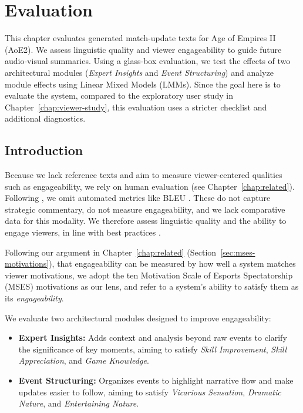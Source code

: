 \chapter{Evaluation}\label{chap:eval}
This chapter evaluates generated match-update texts for Age of Empires II (AoE2). We assess linguistic quality and viewer engageability to guide future audio-visual summaries. Using a glass-box evaluation, we test the effects of two architectural modules (\textit{Expert Insights} and \textit{Event Structuring}) and analyze module effects using Linear Mixed Models (LMMs). Since the goal here is to evaluate the system, compared to the exploratory user study in Chapter~\ref{chap:viewer-study}, this evaluation uses a stricter checklist and additional diagnostics.

\section{Introduction}
Because we lack reference texts and aim to measure viewer-centered qualities such as engageability, we rely on human evaluation (see Chapter~\ref{chap:related}). Following \citet{wang2025}, we omit automated metrics like BLEU \cite{papineni2002}. These do not capture strategic commentary, do not measure engageability, and we lack comparative data for this modality. We therefore assess linguistic quality and the ability to engage viewers, in line with best practices \cite{vanderlee2021}.

Following our argument in Chapter~\ref{chap:related} (Section~\ref{sec:mses-motivations}), that engageability can be measured by how well a system matches viewer motivations, we adopt the ten Motivation Scale of Esports Spectatorship (MSES) motivations \cite{qian2020} as our lens, and refer to a system's ability to satisfy them as its \textit{engageability}.

We evaluate two architectural modules designed to improve engageability:
\begin{itemize}[noitemsep,topsep=0pt]
  \item \textbf{Expert Insights:} Adds context and analysis beyond raw events to clarify the significance of key moments, aiming to satisfy \textit{Skill Improvement}, \textit{Skill Appreciation}, and \textit{Game Knowledge}.
  \item \textbf{Event Structuring:} Organizes events to highlight narrative flow and make updates easier to follow, aiming to satisfy \textit{Vicarious Sensation}, \textit{Dramatic Nature}, and \textit{Entertaining Nature}.
\end{itemize}

